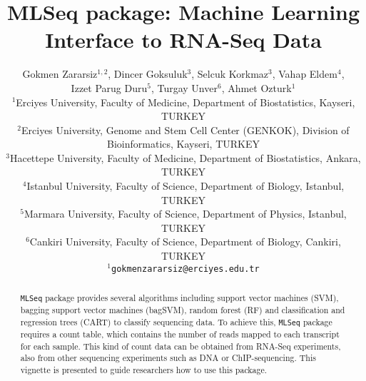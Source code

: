 \documentclass[11pt]{article}\usepackage[]{graphicx}\usepackage[]{color}
\title{\textbf{MLSeq package: Machine Learning Interface to RNA-Seq Data}}
\author{Gokmen Zararsiz$^{1,2}$, Dincer Goksuluk$^3$, Selcuk Korkmaz$^3$, Vahap Eldem$^4$,\\ Izzet Parug Duru$^5$, Turgay Unver$^6$, Ahmet Ozturk$^1$\\[1cm]
\small{$^1$Erciyes University, Faculty of Medicine, Department of Biostatistics, Kayseri, TURKEY}\\[0cm]
\small{$^2$Erciyes University, Genome and Stem Cell Center (GENKOK), Division of Bioinformatics, Kayseri, TURKEY}\\[0cm]
\small{$^3$Hacettepe University, Faculty of Medicine, Department of Biostatistics, Ankara, TURKEY}\\[0cm]
\small{$^4$Istanbul University, Faculty of Science, Department of Biology, Istanbul, TURKEY}\\[0cm]
\small{$^5$Marmara University, Faculty of Science, Department of Physics, Istanbul, TURKEY}\\[0cm]
\small{$^6$Cankiri University, Faculty of Science, Department of Biology, Cankiri, TURKEY}
\\[0cm]\texttt{\small{$^1$gokmenzararsiz@erciyes.edu.tr}}
}
\date{}
\begin{document}
\maketitle
\begin{abstract}
\texttt{MLSeq} package provides several algorithms including support vector machines (SVM), bagging support vector machines (bagSVM), random forest (RF) and classification and regression trees (CART) to classify sequencing data. To achieve this, \texttt{MLSeq} package requires a count table, which contains the number of reads mapped to each transcript for each sample. This kind of count data can be obtained from RNA-Seq experiments, also from other sequencing experiments such as DNA or ChIP-sequencing. This vignette is presented to guide researchers how to use this package. \\[1.5cm]
\end{abstract}
%
%
%
%
%
%
\end{document}
